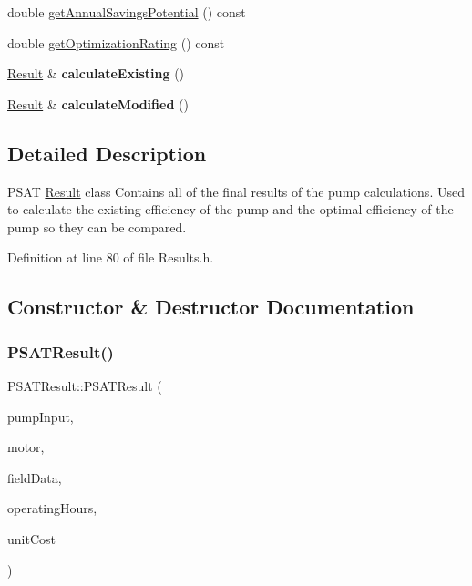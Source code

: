 \begin{DoxyCompactItemize}
\item 
double \hyperlink{class_p_s_a_t_result_a14fc75c2e0e92f74e3df1b97ed13b496}{get\+Annual\+Savings\+Potential} () const
\item 
double \hyperlink{class_p_s_a_t_result_aa0a7001461408fcb06a6c22ce2d064db}{get\+Optimization\+Rating} () const
\item 
\mbox{\label{class_p_s_a_t_result_a949922caf29949199a5de2902851ceb2}} 
\hyperlink{struct_p_s_a_t_result_1_1_result}{Result} \& {\bfseries calculate\+Existing} ()
\item 
\mbox{\label{class_p_s_a_t_result_a37c2bab0e67ac4feb4f04d77aa6a4d77}} 
\hyperlink{struct_p_s_a_t_result_1_1_result}{Result} \& {\bfseries calculate\+Modified} ()
\end{DoxyCompactItemize}


\subsection{Detailed Description}
P\+S\+AT \hyperlink{struct_p_s_a_t_result_1_1_result}{Result} class Contains all of the final results of the pump calculations. Used to calculate the existing efficiency of the pump and the optimal efficiency of the pump so they can be compared. 

Definition at line 80 of file Results.\+h.



\subsection{Constructor \& Destructor Documentation}
\mbox{\label{class_p_s_a_t_result_ad876fe5e1d3da3ad28ccfb6c81f34a98}} 
\subsubsection{\texorpdfstring{P\+S\+A\+T\+Result()}{PSATResult()}\hspace{0.1cm}{\footnotesize\ttfamily [1/3]}}
{\footnotesize\ttfamily P\+S\+A\+T\+Result\+::\+P\+S\+A\+T\+Result (\begin{DoxyParamCaption}\item[{\hyperlink{struct_pump_1_1_input}{Pump\+::\+Input} \&}]{pump\+Input,  }\item[{\hyperlink{struct_motor}{Motor} \&}]{motor,  }\item[{\hyperlink{struct_pump_1_1_field_data}{Pump\+::\+Field\+Data} \&}]{field\+Data,  }\item[{double}]{operating\+Hours,  }\item[{double}]{unit\+Cost }\end{DoxyParamCaption})\hspace{0.3cm}{\ttfamily [inline]}}

